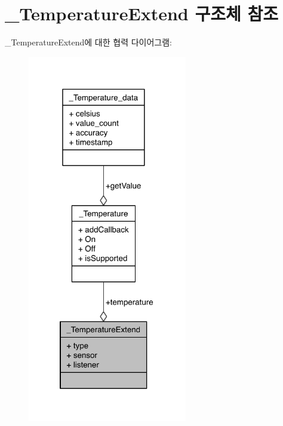 \hypertarget{struct___temperature_extend}{\section{\-\_\-\-Temperature\-Extend 구조체 참조}
\label{struct___temperature_extend}
}


\-\_\-\-Temperature\-Extend에 대한 협력 다이어그램\-:\nopagebreak
\begin{figure}[H]
\begin{center}
\leavevmode
\includegraphics[width=197pt]{d0/d8c/struct___temperature_extend__coll__graph}
\end{center}
\end{figure}
